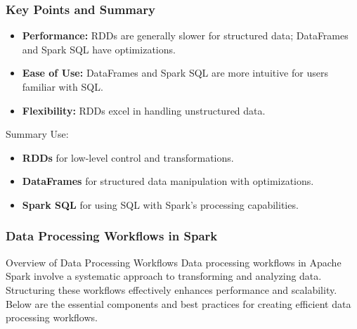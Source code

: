 \documentclass[aspectratio=169]{beamer}
\begin{document}
\begin{frame}
    \frametitle{Key Points and Summary}
    
    \begin{itemize}
        \item \textbf{Performance:} RDDs are generally slower for structured data; DataFrames and Spark SQL have optimizations.
        \item \textbf{Ease of Use:} DataFrames and Spark SQL are more intuitive for users familiar with SQL.
        \item \textbf{Flexibility:} RDDs excel in handling unstructured data.
    \end{itemize}
    
    \begin{block}{Summary}
        Use:
        \begin{itemize}
            \item \textbf{RDDs} for low-level control and transformations.
            \item \textbf{DataFrames} for structured data manipulation with optimizations.
            \item \textbf{Spark SQL} for using SQL with Spark's processing capabilities.
        \end{itemize}
    \end{block}
\end{frame}

\begin{frame}
    \frametitle{Data Processing Workflows in Spark}
    \begin{block}{Overview of Data Processing Workflows}
        Data processing workflows in Apache Spark involve a systematic approach to transforming and analyzing data. Structuring these workflows effectively enhances performance and scalability. Below are the essential components and best practices for creating efficient data processing workflows.
    \end{block}
\end{frame}
\end{document}
